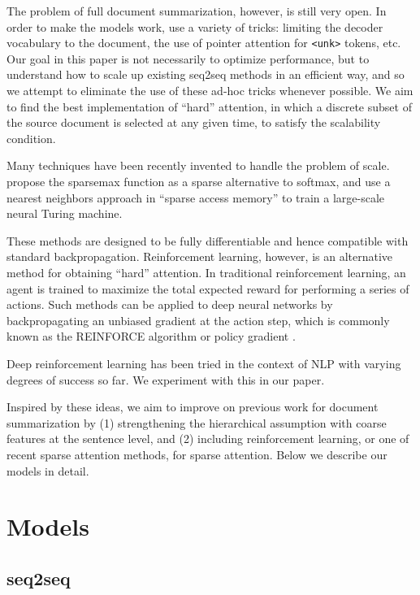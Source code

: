 \documentclass[11pt]{article}
\begin{document}
The problem of full document summarization, however, is still very open. In order to make the models work, \cite{nallapati2016seq2seq} use a variety of tricks: limiting the decoder vocabulary to the document, the use of pointer attention for \texttt{<unk>} tokens, etc. Our goal in this paper is not necessarily to optimize performance, but to understand how to scale up existing seq2seq methods in an efficient way, and so we attempt to eliminate the use of these ad-hoc tricks whenever possible. We aim to find the best implementation of ``hard'' attention, in which a discrete subset of the source document is selected at any given time, to satisfy the scalability condition.

Many techniques have been recently invented to handle the problem of scale. \cite{martins2016sparsemax} propose the sparsemax function as a sparse alternative to softmax, and \cite{rae2016sparsememory} use a nearest neighbors approach in ``sparse access memory'' to train a large-scale neural Turing machine.

These methods are designed to be fully differentiable and hence compatible with standard backpropagation. Reinforcement learning, however, is an alternative method for obtaining ``hard'' attention. In traditional reinforcement learning, an agent is trained to maximize the total expected reward for performing a series of actions. Such methods can be applied to deep neural networks by backpropagating an unbiased gradient at the action step, which is commonly known as the REINFORCE algorithm or policy gradient \citep{williams1992reinforce, schulman2015backprop}.

Deep reinforcement learning has been tried in the context of NLP \citep{zaremba2015rlntm, ranzato2015, li2016dialogueRL} with varying degrees of success so far. We experiment with this in our paper.

Inspired by these ideas, we aim to improve on previous work for document summarization by (1) strengthening the hierarchical assumption with coarse features at the sentence level, and (2) including reinforcement learning, or one of recent sparse attention methods, for sparse attention. Below we describe our models in detail.

\section{Models}

\subsection{seq2seq}
\end{document}
